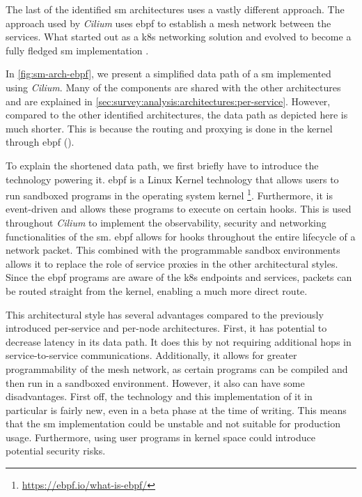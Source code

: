 The last of the identified \gls{sm} architectures uses a vastly different approach. The approach used by \textit{Cilium} uses \gls{ebpf} to establish a mesh network between the services. What started out as a \gls{k8s} networking solution and evolved to become a fully fledged \gls{sm} implementation \cite{cilium-mesh}. 

In \cref{fig:sm-arch-ebpf}, we present a simplified data path of a \gls{sm} implemented using \textit{Cilium}.  Many of the components are shared with the other architectures and are explained in \cref{sec:survey:analysis:architectures:per-service}. However, compared to the other identified architectures, the data path as depicted here is much shorter. This is because the routing and proxying is done in the kernel through \gls{ebpf} (). 

To explain the shortened data path, we first briefly have to introduce the technology powering it. \gls{ebpf} is a Linux Kernel technology that allows users to run sandboxed programs in the operating system kernel \footnote{\url{https://ebpf.io/what-is-ebpf/}}. Furthermore, it is event-driven and allows these programs to execute on certain hooks. This is used throughout \textit{Cilium} to implement the observability, security and networking functionalities of the \gls{sm}. \gls{ebpf} allows for hooks throughout the entire lifecycle of a network packet. This combined with the programmable sandbox environments allows it to replace the role of service proxies in the other architectural styles. Since the \gls{ebpf} programs are aware of the \gls{k8s} endpoints and services, packets can be routed straight from the kernel, enabling a much more direct route.

This architectural style has several advantages compared to the previously introduced per-service and per-node architectures. First, it has potential to decrease latency in its data path. It does this by not requiring additional hops in service-to-service communications. Additionally, it allows for greater programmability of the mesh network, as certain programs can be compiled and then run in a sandboxed environment. However, it also can have some disadvantages. First off, the technology and this implementation of it in particular is fairly new, even in a beta phase at the time of writing. This means that the \gls{sm} implementation could be unstable and not suitable for production usage. Furthermore, using user programs in kernel space could introduce potential security risks. 


    
    


